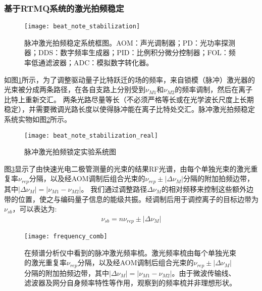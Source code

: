 \subsubsection[基于RTMQ系统的激光拍频稳定]{基于RTMQ系统的激光拍频稳定}

\begin{figure}
    \centering
    \caption[脉冲激光拍频稳定系统框图]{脉冲激光拍频稳定系统框图。AOM：声光调制器；PD：光功率探测器；DDS：数字频率生成器；PID：比例积分微分控制器；FOL：频率低通滤波器；ADC：模拟数字转化器。\label{fig:beat_note_stabilization}}
    \texttt{[image: beat\_note\_stabilization]}
\end{figure}

如图\ref{fig:beat_note_stabilization}所示，为了调整驱动量子比特跃迁的场的频率，来自锁模（脉冲）激光器的光束被分成两条路径，在各自支路上分别受到$\nu_{M1}$和$\nu_{M2}$的频率调制，然后在离子比特上重新交汇。
两条光路尽量等长（不必须严格等长或在光学波长尺度上长期稳定），并需要微调光路长度以使得脉冲能在离子比特处交汇。脉冲激光拍频稳定系统实物如图\ref{fig:beat_note_stabilization_real}所示。

\begin{figure}
    \centering
    \caption[脉冲激光拍频锁定实验系统图]{脉冲激光拍频锁定实验系统图\label{fig:beat_note_stabilization_real}}
    \texttt{[image: beat\_note\_stabilization\_real]}
\end{figure}

图\ref{fig:frequency_comb}显示了由快速光电二极管测量的光束的结果RF光谱，由每个单独光束的激光重复率$\nu_{rep}$分隔，以及经AOM调制后组合光束的$\nu_{rep}\pm |\Delta \nu_M|$分隔的附加拍频边带，其中$|\Delta \nu_M|=|\nu_{M1}-\nu_{M2}|$。
我们通过调整路径$\Delta\nu_M$的相对频移来控制这些额外边带的位置，使之与编码量子信息的能级共振。经调制后用于调控离子的目标边带为$\nu_{sb}$，可以表达为:
\begin{align}
    \nu_{sb}=n\nu_{rep}\pm|\Delta\nu_M|
\end{align}

\begin{figure}
    \centering
    \caption[脉冲激光频率梳]{在频谱分析仪中看到的脉冲激光频率梳。激光频率梳由每个单独光束的激光重复率$\nu_{rep}$分隔，以及经AOM调制后组合光束的$\nu_{rep}\pm |\Delta \nu_M|$分隔的附加拍频边带，其中$|\Delta \nu_M|=|\nu_{M1}-\nu_{M2}|$。由于微波传输线、滤波器及网分自身频率特性等作用，观察到的频率梳并非理想形状。\label{fig:frequency_comb}}
    \texttt{[image: frequency\_comb]}
\end{figure}

